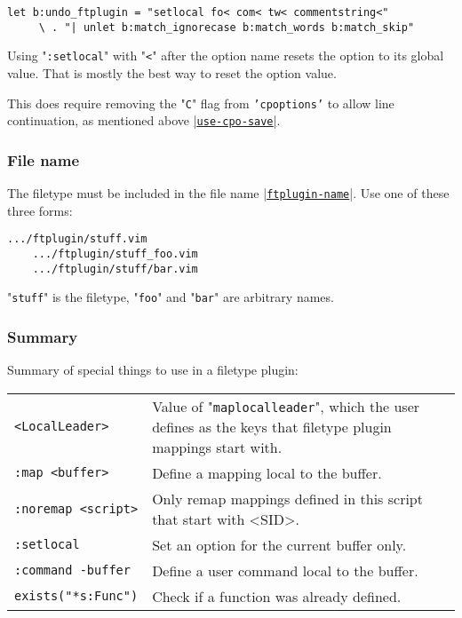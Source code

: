 \begin{Verbatim}[samepage=true]
 let b:undo_ftplugin = "setlocal fo< com< tw< commentstring<"
     \ . "| unlet b:match_ignorecase b:match_words b:match_skip"
\end{Verbatim}

Using "\texttt{:setlocal}" with "\texttt{<}" after the option name resets the option to its global value.
That is mostly the best way to reset the option value.

This does require removing the "\texttt{C}" flag from \texttt{'cpoptions'} to allow line continuation, as mentioned above \hyperref[use-cpo-save]{|\texttt{use-cpo-save}|}.

\subsubsection{File name}
The filetype must be included in the file name \hyperref[ftplugin-name]{|\texttt{ftplugin-name}|}.
Use one of these three forms:

\begin{Verbatim}[samepage=true]
    .../ftplugin/stuff.vim
    .../ftplugin/stuff_foo.vim
    .../ftplugin/stuff/bar.vim
\end{Verbatim}

"\texttt{stuff}" is the filetype, "\texttt{foo}" and "\texttt{bar}" are arbitrary names.

\subsubsection{Summary}
\label{ftplugin-special}
Summary of special things to use in a filetype plugin:

\begin{center} \begin{tabular}{l l} %
				\texttt{<LocalLeader>} & Value of "\texttt{maplocalleader}", which the user defines as the keys that filetype plugin mappings start with. \\
				\texttt{:map <buffer>} & Define a mapping local to the buffer. \\
				\texttt{:noremap <script>} & Only remap mappings defined in this script that start with <SID>. \\
				\texttt{:setlocal} & Set an option for the current buffer only. \\
				\texttt{:command -buffer} & Define a user command local to the buffer. \\
				\texttt{exists("*s:Func")} & Check if a function was already defined. \\
\end{tabular} \end{center}

